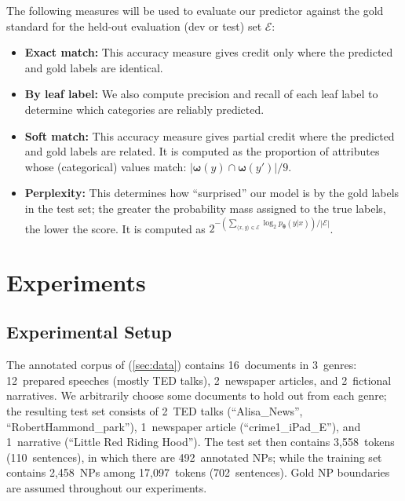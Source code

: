 \documentclass[11pt,letterpaper]{article}
\newcommand{\ensuretext}[1]{#1}
\newcommand{\nssmarker}{\ensuretext{\textcolor{magenta}{\ensuremath{^{\textsc{NS}}_{\textsc{S}}}}}}
\newcommand{\arkcomment}[3]{\ensuretext{\textcolor{#3}{[#1 #2]}}}
\newcommand{\nss}[1]{\arkcomment{\nssmarker}{#1}{magenta}}
\newcommand{\costversion}[1]{}
\begin{document}
The following measures will be used to evaluate our predictor against the gold standard 
for the held-out evaluation (dev or test) set $\mathcal{E}$:
\begin{itemize}
  \item \textbf{Exact match:} This accuracy measure gives credit only where the predicted and gold labels 
  are identical.\costversion{\nss{} When the model is allowed to predict internal labels, we will report 
  overall precision and recall of leaf labels. Otherwise, we report accuracy.}
  \item \textbf{By leaf label:} We also compute precision and recall of each leaf label 
  to determine which categories are reliably predicted.
  \item \textbf{Soft match:} This accuracy measure gives partial credit where the predicted and gold labels 
  are related. It is computed as the proportion of attributes whose (categorical) values match: 
  $|\boldsymbol{\omega}(y) \cap \boldsymbol{\omega}(y')|/9$.
  \item \textbf{Perplexity:} This determines how ``surprised'' our model is by the gold labels 
  in the test set; the greater the probability mass assigned to the true labels, 
  the lower the score. 
  It is computed as $2^{-\left(\sum_{\langle x, y \rangle \in \mathcal{E}} \log_2 p_{\hat{\boldsymbol{\theta}}}(y | x)\right) / |\mathcal{E}|}$.
\end{itemize}

\section{Experiments}\label{sec:exp}

\subsection{Experimental Setup}

The annotated corpus of \citet{bhatia14} (\cref{sec:data}) contains 16~documents 
in 3~genres: 12~prepared speeches (mostly TED talks), 2~newspaper articles, 
and 2~fictional narratives. We arbitrarily choose some documents to hold out from each genre; 
the resulting test set consists of 2~TED talks (``Alisa\_News'', ``RobertHammond\_park''), 
1~newspaper article (``crime1\_iPad\_E''), and 1~narrative (``Little Red Riding Hood'').
The test set then contains 3,558~tokens (110~sentences), in which there are 492~annotated NPs; 
while the training set contains 2,458~NPs among 17,097~tokens (702~sentences).
Gold NP boundaries are assumed throughout our experiments.
\end{document}
